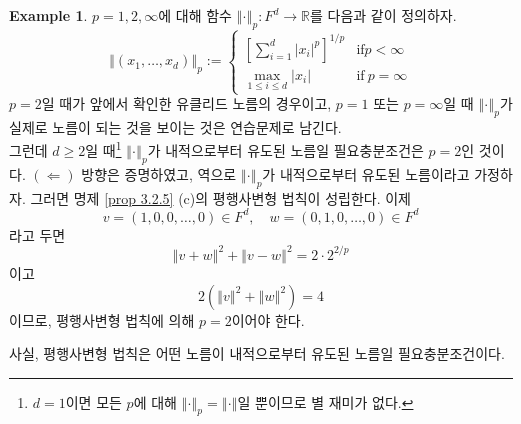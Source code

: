 \documentclass[11pt]{book}
\numberwithin{equation}{chapter}
\def\RR{\mathbb{R}}
\newcommand{\abs}[1]{\left\vert#1\right\vert}
\newcommand{\norm}[1]{\left\Vert#1\right\Vert}
\newcommand{\sqbracket}[1]{\left[#1\right]}
\def\textif{\text{if}}
\theoremstyle{definition}
\newtheorem*{ex}{Example}
\begin{document}
\begin{ex}
     \(p = 1, 2, \infty\)에 대해 함수 \(\norm{\cdot}_p : F^d \to \RR\)를 다음과 같이 정의하자.
    \[
        \norm{(x_1, \ldots, x_d)}_p :=
        \begin{cases}
            \displaystyle
            \sqbracket{\sum_{i=1}^d \abs{x_i}^p}^{1/p} &\textif p < \infty\\
            \displaystyle
            \max_{1 \le i \le d} \abs{x_i} &\textif \ p = \infty
        \end{cases}
    \]
    \(p = 2\)일 때가 앞에서 확인한 유클리드 노름의 경우이고, \(p = 1\) 또는 \(p = \infty\)일 때 \(\norm{\cdot}_p\)가 실제로 노름이 되는 것을 보이는 것은 연습문제로 남긴다.\\
    그런데 \(d \ge 2\)일 때\footnote{\(d = 1\)이면 모든 \(p\)에 대해 \(\norm{\cdot}_p = \norm{\cdot}\)일 뿐이므로 별 재미가 없다.} \(\norm{\cdot}_p\)가 내적으로부터 유도된 노름일 필요충분조건은 \(p = 2\)인 것이다. \((\Leftarrow)\) 방향은 증명하였고, 역으로 \(\norm{\cdot}_p\)가 내적으로부터 유도된 노름이라고 가정하자. 그러면 명제 \ref{prop 3.2.5} (c)의 평행사변형 법칙이 성립한다. 이제
    \[
        v = (1, 0, 0, \ldots, 0) \in F^d, \quad w = (0, 1, 0, \ldots, 0) \in F^d
    \]
    라고 두면
    \[
    \norm{v+w}^2 + \norm{v-w}^2 = 2 \cdot 2^{2/p}
    \]
    이고
    \[
    2(\norm{v}^2 + \norm{w}^2) = 4
    \]
    이므로, 평행사변형 법칙에 의해 \(p = 2\)이어야 한다.
\end{ex}

사실, 평행사변형 법칙은 어떤 노름이 내적으로부터 유도된 노름일 필요충분조건이다.
\end{document}

